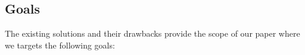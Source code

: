 





\subsection{Goals}
\label{sec:problemStatement:goals}

The existing solutions and their drawbacks provide the scope of our paper where we targets the following goals:

